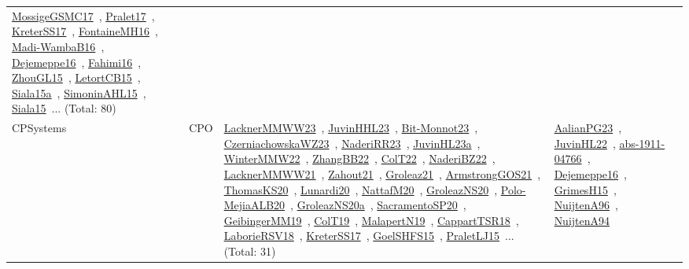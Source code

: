 {\begin{longtable}{lp{3cm}>{\raggedright\arraybackslash}p{6cm}>{\raggedright\arraybackslash}p{6cm}>{\raggedright\arraybackslash}p{8cm}}
\href{../works/MossigeGSMC17.pdf}{MossigeGSMC17}~\cite{MossigeGSMC17}, \href{../works/Pralet17.pdf}{Pralet17}~\cite{Pralet17}, \href{../works/KreterSS17.pdf}{KreterSS17}~\cite{KreterSS17}, \href{../works/FontaineMH16.pdf}{FontaineMH16}~\cite{FontaineMH16}, \href{../works/Madi-WambaB16.pdf}{Madi-WambaB16}~\cite{Madi-WambaB16}, \href{../works/Dejemeppe16.pdf}{Dejemeppe16}~\cite{Dejemeppe16}, \href{../works/Fahimi16.pdf}{Fahimi16}~\cite{Fahimi16}, \href{../works/ZhouGL15.pdf}{ZhouGL15}~\cite{ZhouGL15}, \href{../works/LetortCB15.pdf}{LetortCB15}~\cite{LetortCB15}, \href{../works/Siala15a.pdf}{Siala15a}~\cite{Siala15a}, \href{../works/SimoninAHL15.pdf}{SimoninAHL15}~\cite{SimoninAHL15}, \href{../works/Siala15.pdf}{Siala15}~\cite{Siala15}... (Total: 80)\\
CPSystems & CPO & \href{../works/LacknerMMWW23.pdf}{LacknerMMWW23}~\cite{LacknerMMWW23}, \href{../works/JuvinHHL23.pdf}{JuvinHHL23}~\cite{JuvinHHL23}, \href{../works/Bit-Monnot23.pdf}{Bit-Monnot23}~\cite{Bit-Monnot23}, \href{../works/CzerniachowskaWZ23.pdf}{CzerniachowskaWZ23}~\cite{CzerniachowskaWZ23}, \href{../works/NaderiRR23.pdf}{NaderiRR23}~\cite{NaderiRR23}, \href{../works/JuvinHL23a.pdf}{JuvinHL23a}~\cite{JuvinHL23a}, \href{../works/WinterMMW22.pdf}{WinterMMW22}~\cite{WinterMMW22}, \href{../works/ZhangBB22.pdf}{ZhangBB22}~\cite{ZhangBB22}, \href{../works/ColT22.pdf}{ColT22}~\cite{ColT22}, \href{../works/NaderiBZ22.pdf}{NaderiBZ22}~\cite{NaderiBZ22}, \href{../works/LacknerMMWW21.pdf}{LacknerMMWW21}~\cite{LacknerMMWW21}, \href{../works/Zahout21.pdf}{Zahout21}~\cite{Zahout21}, \href{../works/Groleaz21.pdf}{Groleaz21}~\cite{Groleaz21}, \href{../works/ArmstrongGOS21.pdf}{ArmstrongGOS21}~\cite{ArmstrongGOS21}, \href{../works/ThomasKS20.pdf}{ThomasKS20}~\cite{ThomasKS20}, \href{../works/Lunardi20.pdf}{Lunardi20}~\cite{Lunardi20}, \href{../works/NattafM20.pdf}{NattafM20}~\cite{NattafM20}, \href{../works/GroleazNS20.pdf}{GroleazNS20}~\cite{GroleazNS20}, \href{../works/Polo-MejiaALB20.pdf}{Polo-MejiaALB20}~\cite{Polo-MejiaALB20}, \href{../works/GroleazNS20a.pdf}{GroleazNS20a}~\cite{GroleazNS20a}, \href{../works/SacramentoSP20.pdf}{SacramentoSP20}~\cite{SacramentoSP20}, \href{../works/GeibingerMM19.pdf}{GeibingerMM19}~\cite{GeibingerMM19}, \href{../works/ColT19.pdf}{ColT19}~\cite{ColT19}, \href{../works/MalapertN19.pdf}{MalapertN19}~\cite{MalapertN19}, \href{../works/CappartTSR18.pdf}{CappartTSR18}~\cite{CappartTSR18}, \href{../works/LaborieRSV18.pdf}{LaborieRSV18}~\cite{LaborieRSV18}, \href{../works/KreterSS17.pdf}{KreterSS17}~\cite{KreterSS17}, \href{../works/GoelSHFS15.pdf}{GoelSHFS15}~\cite{GoelSHFS15}, \href{../works/PraletLJ15.pdf}{PraletLJ15}~\cite{PraletLJ15}... (Total: 31) & \href{../works/AalianPG23.pdf}{AalianPG23}~\cite{AalianPG23}, \href{../works/JuvinHL22.pdf}{JuvinHL22}~\cite{JuvinHL22}, \href{../works/abs-1911-04766.pdf}{abs-1911-04766}~\cite{abs-1911-04766}, \href{../works/Dejemeppe16.pdf}{Dejemeppe16}~\cite{Dejemeppe16}, \href{../works/GrimesH15.pdf}{GrimesH15}~\cite{GrimesH15}, \href{../works/NuijtenA96.pdf}{NuijtenA96}~\cite{NuijtenA96}, \href{../works/NuijtenA94.pdf}{NuijtenA94}~\cite{NuijtenA94} & 
\end{longtable}}
